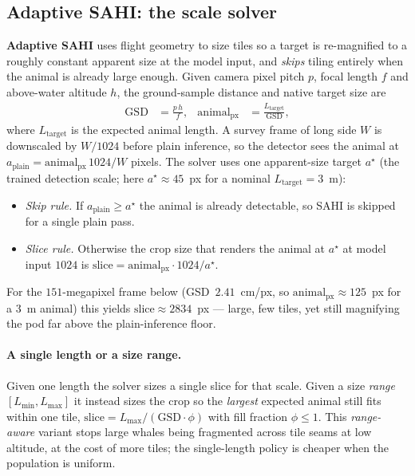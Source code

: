 \documentclass[11pt,a4paper]{article}
\newcommand{\imgsz}{1024}
\begin{document}
\subsection{Adaptive SAHI: the scale solver}
\textbf{Adaptive SAHI} uses flight geometry to size tiles so a target is
re-magnified to a roughly constant apparent size at the model input, and
\emph{skips} tiling entirely when the animal is already large enough. Given
camera pixel pitch $p$, focal length $f$ and above-water altitude $h$, the
ground-sample distance and native target size are
\begin{align}
\mathrm{GSD} &= \frac{p\,h}{f}, &
\text{animal}_{\mathrm{px}} &= \frac{L_{\mathrm{target}}}{\mathrm{GSD}},
\end{align}
where $L_{\mathrm{target}}$ is the expected animal length. A survey frame of
long side $W$ is downscaled by $W/\imgsz$ before plain inference, so the detector
sees the animal at $a_{\text{plain}}=\text{animal}_{\mathrm{px}}\,\imgsz/W$
pixels. The solver uses one apparent-size target $a^\star$ (the trained
detection scale; here $a^\star\!\approx\!45$~px for a nominal
$L_{\mathrm{target}}\!=\!3$~m):
\begin{itemize}[itemsep=1pt,topsep=2pt]
  \item \emph{Skip rule.} If $a_{\text{plain}}\ge a^\star$ the animal is already
  detectable, so SAHI is skipped for a single plain pass.
  \item \emph{Slice rule.} Otherwise the crop size that renders the animal at
  $a^\star$ at model input $\imgsz$ is
  $\text{slice}=\text{animal}_{\mathrm{px}}\cdot \imgsz/a^\star$.
\end{itemize}
For the $151$-megapixel frame below (GSD~$2.41$~cm/px, so
$\text{animal}_{\mathrm{px}}\!\approx\!125$~px for a $3$~m animal) this yields
$\text{slice}\!\approx\!2834$~px --- large, few tiles, yet still magnifying the
pod far above the plain-inference floor.

\paragraph{A single length or a size range.}
Given one length the solver sizes a single slice for that scale. Given a size
\emph{range} $[L_{\min},L_{\max}]$ it instead sizes the crop so the
\emph{largest} expected animal still fits within one tile,
$\text{slice}=L_{\max}/(\mathrm{GSD}\cdot\phi)$ with fill fraction
$\phi\!\le\!1$. This \emph{range-aware} variant stops large whales being
fragmented across tile seams at low altitude, at the cost of more tiles; the
single-length policy is cheaper when the population is uniform.
\end{document}
